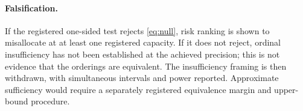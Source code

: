 \paragraph{Falsification.}  If the registered one-sided test rejects
\eqref{eq:null}, risk ranking is shown to misallocate at at least one registered
capacity.  If it does not reject, ordinal insufficiency has not been established
at the achieved precision; this is not evidence that the orderings are
equivalent.  The insufficiency framing is then withdrawn, with simultaneous intervals
and power reported.  Approximate sufficiency would require a separately
registered equivalence margin and upper-bound procedure.

